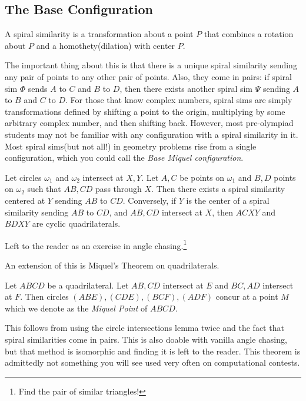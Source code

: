 \documentclass[11pt]{article}
\begin{document}
\subsection{The Base Configuration}
\begin{defi}

A spiral similarity is a transformation about a point $P$ that combines a rotation about $P$ and a homothety(dilation) with center $P$. 
\end{defi}
The important thing about this is that there is a unique spiral similarity sending any pair of points to any other pair of points. Also, they come in pairs: if spiral sim $\Phi$ sends $A$ to $C$ and $B$ to $D$, then there exists another spiral sim $\Psi$ sending $A$ to $B$ and $C$ to $D$. For those that know complex numbers, spiral sims are simply transformations defined by shifting a point to the origin, multiplying by some arbitrary complex number, and then shifting back. However, most pre-olympiad students may not be familiar with any configuration with a spiral similarity in it. Most spiral sims(but not all!) in geometry problems rise from a single configuration, which you could call the \textit{Base Miquel configuration}.
\begin{lemma}
Let circles $\omega_1$ and $\omega_2$ intersect at $X,Y$. Let $A,C$ be points on $\omega_1$ and $B,D$ points on $\omega_2$ such that $AB,CD$ pass through $X$. Then there exists a spiral similarity centered at $Y$ sending $AB$ to $CD$. Conversely, if $Y$ is the center of a spiral similarity sending $AB$ to $CD$, and $AB,CD$ intersect at $X$, then $ACXY$ and $BDXY$ are cyclic quadrilaterals.
\end{lemma}
\begin{pro}
Left to the reader as an exercise in angle chasing.\footnote{Find the pair of similar triangles!}
\end{pro}
An extension of this is Miquel's Theorem on quadrilaterals.
\begin{theo}
Let $ABCD$ be a quadrilateral. Let $AB,CD$ intersect at $E$ and $BC, AD$ intersect at $F$. Then circles $(ABE),(CDE),(BCF),(ADF)$ concur at a point $M$ which we denote as the \textit{Miquel Point} of $ABCD$.
\end{theo}
\begin{pro}
This follows from using the circle intersections lemma twice and the fact that spiral similarities come in pairs. This is also doable with vanilla angle chasing, but that method is isomorphic and finding it is left to the reader. This theorem is admittedly not something you will see used very often on computational contests.
\end{pro}
\end{document}
